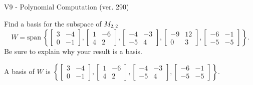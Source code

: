 \begin{exercise}
  \begin{exerciseTitle}V9 - Polynomial Computation (ver. 290)\end{exerciseTitle}
  \begin{exerciseStatement}
    Find a basis for the subspace of \(M_{2,2}\) 
\[W=\mathrm{span}\ \left\{\left[\begin{array}{cc}
3 & -4 \\
0 & -1
\end{array}\right] , \left[\begin{array}{cc}
1 & -6 \\
4 & 2
\end{array}\right] , \left[\begin{array}{cc}
-4 & -3 \\
-5 & 4
\end{array}\right] , \left[\begin{array}{cc}
-9 & 12 \\
0 & 3
\end{array}\right] , \left[\begin{array}{cc}
-6 & -1 \\
-5 & -5
\end{array}\right]\right\}.\]
 Be sure to explain why your result is a basis.


  \end{exerciseStatement}
  \begin{exerciseAnswer}
   A basis of \(W\) is  \(\left\{\left[\begin{array}{cc}
3 & -4 \\
0 & -1
\end{array}\right] , \left[\begin{array}{cc}
1 & -6 \\
4 & 2
\end{array}\right] , \left[\begin{array}{cc}
-4 & -3 \\
-5 & 4
\end{array}\right] , \left[\begin{array}{cc}
-6 & -1 \\
-5 & -5
\end{array}\right]\right\}\).
  


  \end{exerciseAnswer}
\end{exercise}